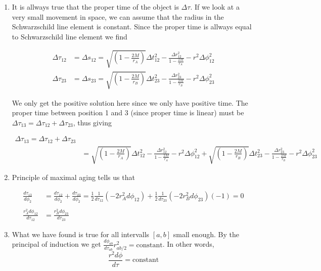 \documentclass[a4paper,10pt,english]{article}
\begin{document}
\begin{enumerate}

\item It is allways true that the proper time of the object is $\Delta \tau$. If we look at a very small movement in space, we can assume that the radius in the Schwarzschild line element is constant. Since the proper time is allways equal to Schwarzschild line element we find

\begin{align*}
\Delta \tau_{12}&=\Delta s_{12}=\sqrt{\left(1-\frac{2M}{r_{A}}\right)}\Delta t_{12}^{2}-\frac{\Delta r_{12}^{2}}{1-\frac{2M}{r_{A}}}-r^{2}\Delta \phi_{12}^{2}\\
\Delta \tau_{23}&=\Delta s_{23}=\sqrt{\left(1-\frac{2M}{r_{B}}\right)}\Delta t_{23}^{2}-\frac{\Delta r_{23}^{2}}{1-\frac{2M}{r_{B}}}-r^{2}\Delta \phi_{23}^{2}
\end{align*}

We only get the positive solution here since we only have positive time. The proper time between position 1 and 3 (since proper time is linear) must be $\Delta \tau_{13}=\Delta \tau_{12}+\Delta \tau_{23}$, thus giving

\begin{align*}
\Delta \tau_{13}=\Delta \tau_{12}+\Delta \tau_{23}\\
&=\sqrt{\left(1-\frac{2M}{r_{A}}\right)}\Delta t_{12}^{2}-\frac{\Delta r_{12}^{2}}{1-\frac{2M}{r_{A}}}-r^{2}\Delta \phi_{12}^{2}+\sqrt{\left(1-\frac{2M}{r_{B}}\right)}\Delta t_{23}^{2}-\frac{\Delta r_{23}^{2}}{1-\frac{2M}{r_{B}}}-r^{2}\Delta \phi_{23}^{2}
\end{align*}

\item Principle of maximal aging tells us that 

\begin{align*}
\frac{d\tau_{13}}{d\phi_{2}}&=\frac{d\tau_{12}}{d\phi_{2}}+\frac{d\tau_{23}}{d\phi_{2}}=\frac{1}{2}\frac{1}{d\tau_{12}}(-2r_{A}^{2}d\phi_{12})+\frac{1}{2}\frac{1}{d\tau_{23}}(-2r_{B}^{2}d\phi_{23})(-1)=0\\ \\
\frac{r_{A}^{2}d\phi_{12}}{d\tau_{12}}&=\frac{r_{B}^{2}d\phi_{23}}{d\tau_{23}}
\end{align*}

\item What we have found is true for all intervalls $[a,b]$ small enough. By the principal of induction we get $\frac{d\phi_{ab}}{d\tau_{ab}}r_{ab/2}^{2}=\text{constant}$. In other words, \[\frac{r^{2}d\phi}{d\tau}=\text{constant}\]


\end{enumerate}
\end{document}

